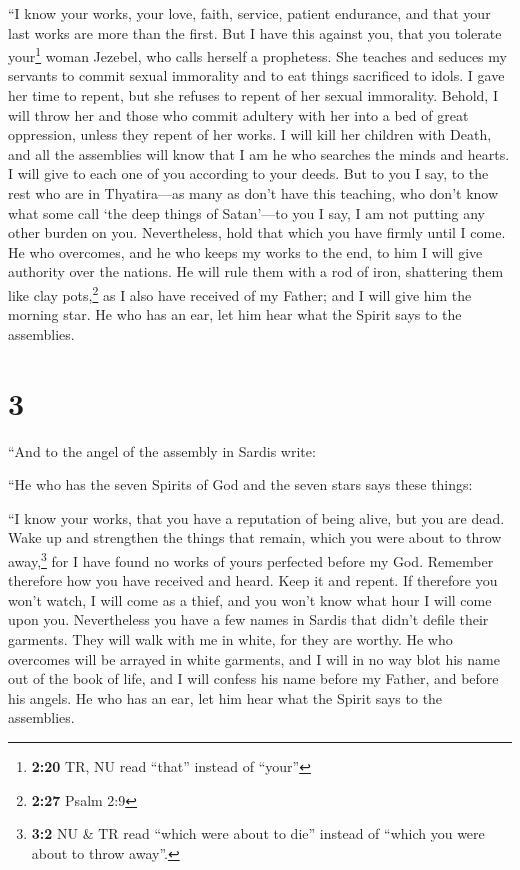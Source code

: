  ``I know your works, your love, faith, service, patient
endurance, and that your last works are more than the first.
 But I have this against you, that you tolerate
your\footnote{\textbf{2:20} TR, NU read ``that'' instead of ``your''}
woman Jezebel, who calls herself a prophetess. She teaches and seduces
my servants to commit sexual immorality and to eat things sacrificed to
idols.  I gave her time to repent, but she refuses to
repent of her sexual immorality.  Behold, I will throw
her and those who commit adultery with her into a bed of great
oppression, unless they repent of her works.  I will kill
her children with Death, and all the assemblies will know that I am he
who searches the minds and hearts. I will give to each one of you
according to your deeds.  But to you I say, to the rest
who are in Thyatira---as many as don't have this teaching, who don't
know what some call `the deep things of Satan'---to you I say, I am not
putting any other burden on you.  Nevertheless, hold that
which you have firmly until I come.  He who overcomes,
and he who keeps my works to the end, to him I will give authority over
the nations.  He will rule them with a rod of iron,
shattering them like clay pots,\footnote{\textbf{2:27} Psalm 2:9} as I
also have received of my Father;  and I will give him the
morning star.  He who has an ear, let him hear what the
Spirit says to the assemblies.

\hypertarget{section-2}{%
\section{3}\label{section-2}}

 ``And to the angel of the assembly in Sardis write:

``He who has the seven Spirits of God and the seven stars says these
things:

``I know your works, that you have a reputation of being alive, but you
are dead.  Wake up and strengthen the things that remain,
which you were about to throw away,\footnote{\textbf{3:2} NU \& TR read
  ``which were about to die'' instead of ``which you were about to throw
  away''.} for I have found no works of yours perfected before my God.
 Remember therefore how you have received and heard. Keep
it and repent. If therefore you won't watch, I will come as a thief, and
you won't know what hour I will come upon you. 
Nevertheless you have a few names in Sardis that didn't defile their
garments. They will walk with me in white, for they are worthy.
 He who overcomes will be arrayed in white garments, and I
will in no way blot his name out of the book of life, and I will confess
his name before my Father, and before his angels.  He who
has an ear, let him hear what the Spirit says to the assemblies.

